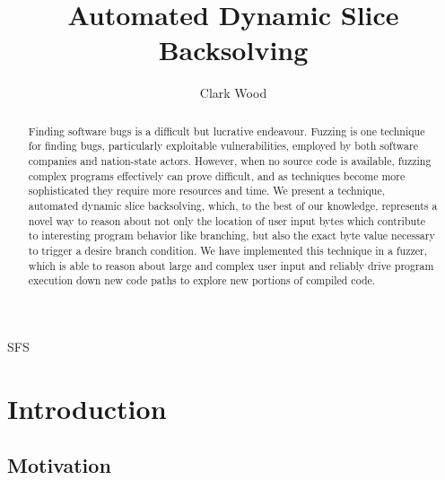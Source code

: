 \documentclass[11pt,expanded,copyright]{fsuthesis}
\title{Automated Dynamic Slice Backsolving}
\author{Clark Wood}
\begin{document}
\frontmatter
\maketitle
\makecommitteepage


\begin{acknowledgments}
SFS
\end{acknowledgments}

\tableofcontents
\listoffigures




\mainmatter

%

\begin{abstract}

Finding software bugs is a difficult but lucrative endeavour. Fuzzing is one technique for finding bugs, particularly exploitable vulnerabilities, employed by both software companies and nation-state actors. However, when no source code is available, fuzzing complex programs effectively can prove difficult, and as techniques become more sophisticated they require more resources and time. We present a technique, automated dynamic slice backsolving, which, to the best of our knowledge, represents a novel way to reason about not only the location of user input bytes which contribute to interesting program behavior like branching, but also the exact byte value necessary to trigger a desire branch condition. We have implemented this technique in a fuzzer, which is able to reason about large and complex user input and reliably drive program execution down new code paths to explore new portions of compiled code.

\end{abstract}

\chapter{Introduction}

\section{Motivation}
\end{document}
